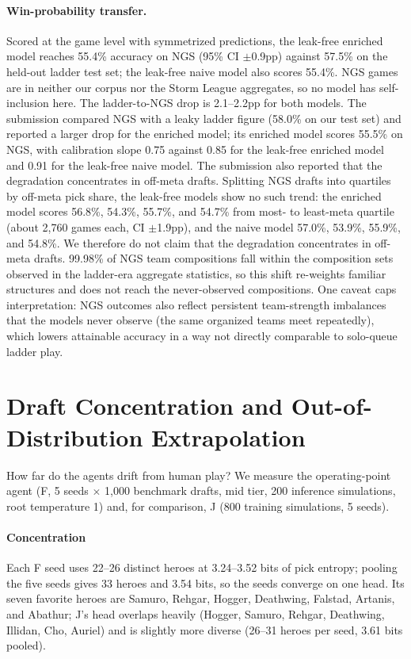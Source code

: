 \documentclass[journal]{IEEEtran}
\begin{document}
\paragraph{Win-probability transfer.} Scored at the game level with symmetrized predictions, the leak-free enriched model reaches 55.4\% accuracy on NGS (95\% CI $\pm$0.9pp) against 57.5\% on the held-out ladder test set; the leak-free naive model also scores 55.4\%. NGS games are in neither our corpus nor the Storm League aggregates, so no model has self-inclusion here. The ladder-to-NGS drop is 2.1--2.2pp for both models. The submission compared NGS with a leaky ladder figure (58.0\% on our test set) and reported a larger drop for the enriched model; its enriched model scores 55.5\% on NGS, with calibration slope 0.75 against 0.85 for the leak-free enriched model and 0.91 for the leak-free naive model. The submission also reported that the degradation concentrates in off-meta drafts. Splitting NGS drafts into quartiles by off-meta pick share, the leak-free models show no such trend: the enriched model scores 56.8\%, 54.3\%, 55.7\%, and 54.7\% from most- to least-meta quartile (about 2,760 games each, CI $\pm$1.9pp), and the naive model 57.0\%, 53.9\%, 55.9\%, and 54.8\%. We therefore do not claim that the degradation concentrates in off-meta drafts. 99.98\% of NGS team compositions fall within the composition sets observed in the ladder-era aggregate statistics, so this shift re-weights familiar structures and does not reach the never-observed compositions. One caveat caps interpretation: NGS outcomes also reflect persistent team-strength imbalances that the models never observe (the same organized teams meet repeatedly), which lowers attainable accuracy in a way not directly comparable to solo-queue ladder play.

\section{Draft Concentration and Out-of-Distribution Extrapolation}
\label{sec:concentration}

How far do the agents drift from human play? We measure the operating-point agent (F, 5 seeds $\times$ 1,000 benchmark drafts, mid tier, 200 inference simulations, root temperature 1) and, for comparison, J (800 training simulations, 5 seeds).

\paragraph{Concentration} Each F seed uses 22--26 distinct heroes at 3.24--3.52 bits of pick entropy; pooling the five seeds gives 33 heroes and 3.54 bits, so the seeds converge on one head. Its seven favorite heroes are Samuro, Rehgar, Hogger, Deathwing, Falstad, Artanis, and Abathur; J's head overlaps heavily (Hogger, Samuro, Rehgar, Deathwing, Illidan, Cho, Auriel) and is slightly more diverse (26--31 heroes per seed, 3.61 bits pooled).
\end{document}

